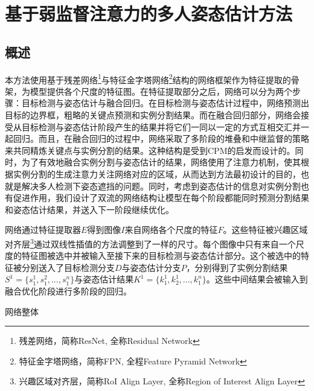\chapter{基于弱监督注意力的多人姿态估计方法}
\label{cha:method}

\section{概述}
\label{sec:methodoverview}
本方法使用基于残差网络\footnote{残差网络，简称ResNet, 全称Residual Network}与特征金字塔网络\footnote{特征金字塔网络，简称FPN, 全程Feature Pyramid Network}结构的网络框架作为特征提取的骨架，为模型提供各个尺度的特征图。在特征提取部分之后，网络可以分为两个步骤：目标检测与姿态估计与融合回归。在目标检测与姿态估计过程中，网络预测出目标的边界框，粗略的关键点预测和实例分割结果。而在融合回归部分，网络会接受从目标检测与姿态估计阶段产生的结果并将它们一同以一定的方式互相交汇并一起回归。而且，在融合回归的过程中，网络采取了多阶段的堆叠和中继监督的策略来共同精炼关键点与实例分割的结果。这种结构是受到CPM\cite{wei2016convolutional}的启发而设计的。同时，为了有效地融合实例分割与姿态估计的结果，网络使用了注意力机制，使其根据实例分割的生成注意力关注网络对应的区域，从而达到方法最初设计的目的，也就是解决多人检测下姿态遮挡的问题。同时，考虑到姿态估计的信息对实例分割也有促进作用，我们设计了双流的网络结构让模型在每个阶段都能同时预测分割结果和姿态估计结果，并送入下一阶段继续优化。

网络通过特征提取器$E$得到图像$I$来自网络各个尺度的特征$F$。这些特征被兴趣区域对齐层\footnote{兴趣区域对齐层，简称RoI Align Layer, 全称Region of Interest Align Layer}通过双线性插值的方法调整到了一样的尺寸。每个图像中只有来自一个尺度的特征图被选中并被输入至接下来的目标检测与姿态估计部分。这个被选中的特征被分别送入了目标检测分支$D$与姿态估计分支$P$，分别得到了实例分割结果$S^1=\{s_1^1, s_1^2, ..., s_1^n\}$与姿态估计结果$K^1=\{k_1^1, k_2^1, ..., k_1^n\}$。这些中间结果会被输入到融合优化阶段进行多阶段的回归。

网络整体

